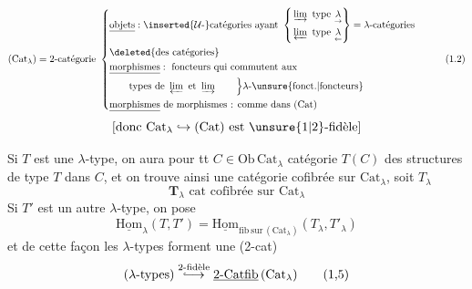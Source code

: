 {\scriptsize
\[
\begin{aligned}
(\mathrm{Cat}_{\lambda})&=\text{2-catégorie }
\left\{\begin{aligned}
 &\underline{\text{objets}}: \inserted{\mathcal U\text{-}}\text{catégories ayant }
 \left\{\begin{aligned}&\varinjlim\ \text{type }\underset{\rightarrow}{\lambda}\\[-1pt]&\varprojlim\ \text{type }\underset{\leftarrow}{\lambda}\end{aligned}\right\}=\lambda\text{-catégories}\\
 &\text{\deleted{des catégories}}\\
 &\underline{\text{morphismes}}:\text{ foncteurs qui commutent aux}\\
 &\qquad\text{types de }\varprojlim\text{ et }\varinjlim\qquad\Big\} \lambda\text{-}\unsure{\text{fonct.}|\text{foncteurs}}\\
 &\underline{\text{morphismes}}\text{ de morphismes : comme dans }(\mathrm{Cat})
\end{aligned}\right.
\end{aligned}\tag*{(1.2)}
\]
}
\[
[\text{donc }\mathrm{Cat}_{\lambda}\hookrightarrow(\mathrm{Cat})\text{ est }\unsure{1|2}\text{-fidèle}]
\]

Si $T$ est une   $\lambda$-type, on aura
pour tt $C\in\mathrm{Ob}\,\mathrm{Cat}_{\lambda}$  catégorie $T(C)$ des
structures de type $T$ dans $C$, et on trouve ainsi une
catégorie cofibrée sur $\mathrm{Cat}_{\lambda}$, soit $T_{\lambda}$
\[
\mathbf T_{\lambda}\text{ cat cofibrée sur }\mathrm{Cat}_{\lambda}\tag*{(1.3)}
\]
Si $T'$ est un autre  $\lambda$-type, on pose
\[
\underline{\mathrm{Hom}}_{\lambda}(T,T')=\underline{\mathrm{Hom}}_{\mathrm{fib\ sur}\,(\mathrm{Cat}_{\lambda})}(T_{\lambda},T'_{\lambda})\tag*{(1.4)}
\]
et de cette façon les $\lambda$-types forment une (2-cat)
\[
(\lambda\text{-types})\overset{\text{2-fidèle}}{\lhook\joinrel\longrightarrow}\underline{2\text{-}\mathrm{Catfib}}\,(\mathrm{Cat}_{\lambda})\tag*{(1,5)}
\]

